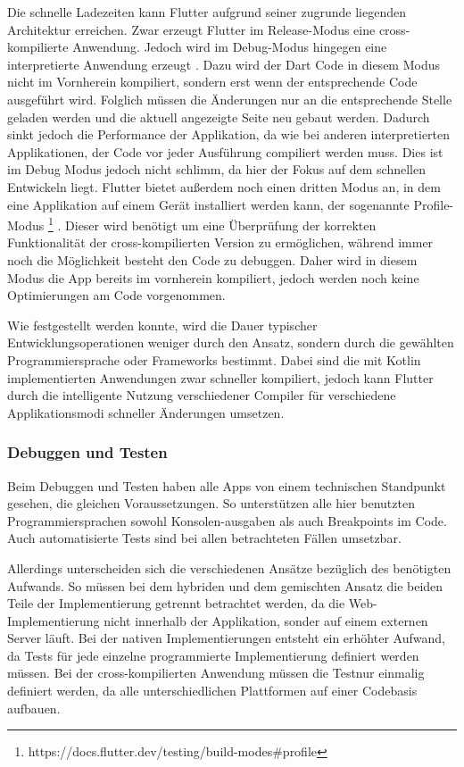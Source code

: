 Die schnelle Ladezeiten kann Flutter aufgrund seiner zugrunde liegenden Architektur erreichen. Zwar erzeugt Flutter im Release-Modus eine cross-kompilierte Anwendung. Jedoch wird im Debug-Modus hingegen eine interpretierte Anwendung erzeugt \cite{flutter_debug_dart}. Dazu wird der Dart Code in diesem Modus nicht im Vornherein kompiliert, sondern erst wenn der entsprechende Code ausgeführt wird. Folglich müssen die Änderungen nur an die entsprechende Stelle geladen werden und die aktuell angezeigte Seite neu gebaut werden. Dadurch sinkt jedoch die Performance der Applikation, da wie bei anderen interpretierten Applikationen, der Code vor jeder Ausführung compiliert werden muss. Dies ist im Debug Modus jedoch nicht schlimm, da hier der Fokus auf dem schnellen Entwickeln liegt. Flutter bietet außerdem noch einen dritten Modus an, in dem eine Applikation auf einem Gerät installiert werden kann, der sogenannte Profile-Modus \footnote{https://docs.flutter.dev/testing/build-modes\#profile} \cite{flutter_debug_dart}. 
Dieser wird benötigt um eine Überprüfung der korrekten Funktionalität der cross-kompilierten Version zu ermöglichen, während immer noch die Möglichkeit besteht den Code zu debuggen. Daher wird in diesem Modus die App bereits im vornherein kompiliert, jedoch werden noch keine Optimierungen am Code vorgenommen.

Wie festgestellt werden konnte, wird die Dauer typischer Entwicklungsoperationen weniger durch den Ansatz, sondern durch die gewählten Programmiersprache oder Frameworks bestimmt. Dabei sind die mit Kotlin implementierten Anwendungen zwar schneller kompiliert, jedoch kann Flutter durch die intelligente Nutzung verschiedener Compiler für verschiedene Applikationsmodi schneller Änderungen umsetzen.

\subsubsection{Debuggen und Testen}
Beim Debuggen und Testen haben alle Apps von einem technischen Standpunkt gesehen, die gleichen Voraussetzungen. So unterstützen alle hier benutzten Programmiersprachen sowohl Konsolen-ausgaben als auch Breakpoints im Code. Auch automatisierte Tests sind bei allen betrachteten Fällen umsetzbar.

Allerdings unterscheiden sich die verschiedenen Ansätze bezüglich des benötigten Aufwands. So müssen bei dem hybriden und dem gemischten Ansatz die beiden Teile der Implementierung getrennt betrachtet werden, da die Web-Implementierung nicht innerhalb der Applikation, sonder auf einem externen Server läuft. Bei der nativen Implementierungen entsteht ein erhöhter Aufwand, da Tests für jede einzelne programmierte Implementierung definiert werden müssen. Bei der cross-kompilierten Anwendung müssen die Testnur einmalig definiert werden, da alle unterschiedlichen Plattformen auf einer Codebasis aufbauen.

